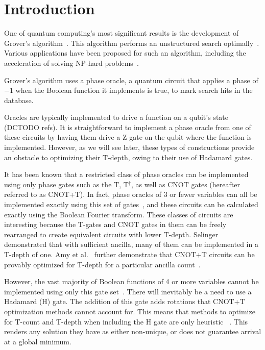 \section{Introduction}
One of quantum computing's most significant results is the development of Grover's
algorithm~\cite{bib-grover1996fast}. This algorithm performs an unstructured search
optimally~\cite{bib-zaika-grov-opt}. Various applications have
been proposed for such an algorithm, including the acceleration of solving NP-hard
problems~\cite{bib-williams-grover-np}.

Grover's algorithm uses a phase oracle, a quantum circuit that applies a phase of
$-1$ when the Boolean function it implements is true, to mark search hits in the
database.

Oracles are typically implemented to drive a function on a qubit's state (DCTODO refs).
It is straightforward to implement a phase oracle from one of these circuits by having
them drive a Z gate on the qubit where the function is implemented. However, as we
will see later, these types of constructions provide an obstacle to optimizing their
T-depth, owing to their use of Hadamard gates.

It has been known that a restricted class of phase oracles can be implemented
using only phase gates such as the T, T$^\dagger$, as well as CNOT gates (hereafter
referred to as CNOT+T). In fact, phase oracles of 3 or fewer variables can all be
implemented exactly using this set of gates~\cite{bib-amy-cnot}, and these circuits
can be calculated exactly using the Boolean Fourier transform. These classes of
circuits are interesting because the T-gates and CNOT gates in them can be freely rearranged
to create equivalent circuits with lower T-depth. Selinger~\cite{bib-selinger-tdepthone}
demonstrated that with sufficient ancilla, many of them can be implemented in a
T-depth of one. Amy et al.~\cite{amy-meet-in-middle} further demonstrate that CNOT+T
circuits can be provably optimized for T-depth for a particular ancilla
count~\cite{bib-amy-matroid}.

However, the vast majority of Boolean functions of 4 or more variables cannot be
implemented using only this gate set~\cite{bib-amy-rm}. There will inevitably be a need to use
a Hadamard (H) gate. The addition of this gate adds rotations that CNOT+T optimization
methods cannot account for. This means that methods to optimize for T-count and T-depth when
including the H gate are only heuristic ~\cite{amy-meet-in-middle,bib-amy-matroid,bib-amy-rm}.
This renders any solution they have as either non-unique, or does not guarantee arrival
at a global minimum.

